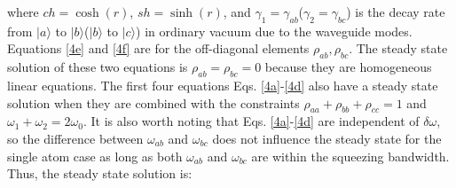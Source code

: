 \documentclass[aps,showpacs,twocolumn,twoside,groupedaddress]{revtex4}
\begin{document}
where $ch=\cosh(r)$, $sh=\sinh(r)$, and $\gamma_{1}=\gamma_{ab}$($\gamma_{2}=\gamma_{bc}$) is the decay rate from $|a\rangle$ to $|b\rangle$($|b\rangle$ to $|c\rangle$) in ordinary vacuum due to the waveguide modes. Equations \eqref{4e} and \eqref{4f} are for the off-diagonal elements $\rho_{ab}, \rho_{bc}$. The steady state solution of these two equations is $\rho_{ab}=\rho_{bc}=0$ because they are homogeneous linear equations. The first four equations Eqs.  \eqref{4a}-\eqref{4d} also have a steady state solution when they are combined with the constraints $\rho_{aa}+\rho_{bb}+\rho_{cc}=1$ and $\omega_1+\omega_2=2\omega_0$. It is also worth noting that Eqs. \eqref{4a}-\eqref{4d} are independent of $\delta\omega$, so the difference between $\omega_{ab}$ and $\omega_{bc}$ does not influence the steady state for the single atom case as long as both $\omega_{ab}$ and $\omega_{bc}$ are within the squeezing bandwidth. Thus, the steady state solution is:
\end{document}
